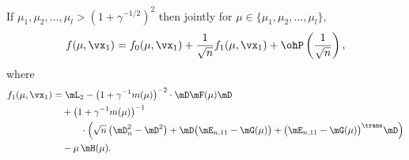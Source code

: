 \begin{lemma}
    If $\mu_1, \mu_2, \ldots, \mu_l > (1 + \gamma^{-1/2})^2$ then jointly
    for $\mu \in \{ \mu_1, \mu_2, \ldots, \mu_l \}$,
    \[
        f( \mu, \vx_1 ) 
            = 
                f_0( \mu, \vx_1 )
                +
                \frac{1}{\sqrt{n}}
                f_1( \mu, \vx_1 )
                +
                \ohP\left( \frac{1}{\sqrt{n}} \right),
    \]
    where
    \begin{equation*}
        \begin{split}
            f_1( \mu, \vx_1 ) 
                &= \mL_2 
                -
                \big( 1 + \gamma^{-1} m(\mu) \big)^{-2}
                    \cdot
                    \mD \mF(\mu) \mD \\
                &\quad+ 
                \big( 1 + \gamma^{-1} m(\mu) \big)^{-1} \\
                    &\quad\qquad\cdot
                    \Big(
                        \sqrt{n} \left( \mD_n^2 - \mD^2 \right)
                        +
                        \mD \big( \mE_{n,11} - \mG(\mu) \big)
                        + 
                        \big( \mE_{n,11} - \mG(\mu) \big)^\trans \mD
                    \Big)  \\
                &\quad-
                \mu \, \mH(\mu) .
        \end{split}
    \end{equation*}
\end{lemma}
